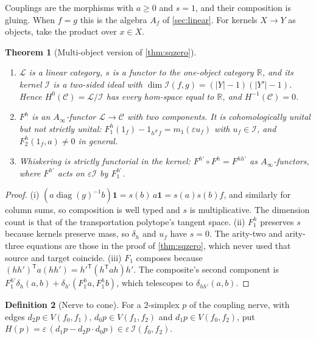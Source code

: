 \documentclass[11pt]{article}
\newtheorem{theorem}{Theorem}[section]
\theoremstyle{definition}
\newtheorem{definition}[theorem]{Definition}
\theoremstyle{remark}
\begin{document}
Couplings are the morphisms with $a\ge0$ and $s=1$, and their composition is gluing. When $f=g$ this is the algebra $A_f$
of \cref{sec:linear}. For kernels $X\to Y$ as objects, take the product over $x\in X$.

\begin{theorem}[Multi-object version of \cref{thm:sqzero}]\label{thm:multicone}
\begin{enumerate}[label=(\roman*)]
\item $\mathcal L$ is a linear category, $s$ is a functor to the one-object category $\mathbb R$, and its kernel $\mathcal I$ is a
  two-sided ideal with $\dim\mathcal I(f,g)=(\lvert Y\rvert-1)(\lvert Y'\rvert-1)$. Hence $H^0(\mathcal C)=\mathcal L/\mathcal I$ has every
  hom-space equal to $\mathbb R$, and $H^{-1}(\mathcal C)=0$.
\item $F^h$ is an $A_\infty$-functor $\mathcal L\to\mathcal C$ with two components. It is cohomologically unital but not strictly
  unital: $F_1^h(1_f)-1_{h^\#f}=m_1(\varepsilon u_f)$ with $u_f\in\mathcal I$, and $F_2^h(1_f,a)\ne0$ in general.
\item Whiskering is strictly functorial in the kernel: $F^{h'}\circ F^h=F^{hh'}$ as $A_\infty$-functors, where $F^{h'}$ acts on
  $\varepsilon\mathcal I$ by $F_1^{h'}$.
\end{enumerate}
\end{theorem}
\begin{proof}
(i) $(a\operatorname{diag}(g)^{-1}b)\mathbf 1=s(b)\,a\mathbf 1=s(a)s(b)f$, and similarly for column sums, so composition is well typed
and $s$ is multiplicative. The dimension count is that of the transportation polytope's tangent space. (ii) $F_1^h$ preserves
$s$ because kernels preserve mass, so $\delta_h$ and $u_f$ have $s=0$. The arity-two and arity-three equations are those
in the proof of \cref{thm:sqzero}, which never used that source and target coincide. (iii) $F_1$ composes because
$(hh')^{\mathsf T}a(hh')=h'^{\mathsf T}(h^{\mathsf T}ah)h'$. The composite's second component is
$F_1^{h'}\delta_h(a,b)+\delta_{h'}(F_1^ha,F_1^hb)$, which telescopes to $\delta_{hh'}(a,b)$.
\end{proof}

\begin{definition}[Nerve to cone]\label{def:nervecone}
For a 2-simplex $p$ of the coupling nerve, with edges $d_2p\in V(f_0,f_1)$, $d_0p\in V(f_1,f_2)$ and $d_1p\in V(f_0,f_2)$, put
$H(p)=\varepsilon\,(d_1p-d_2p\cdot d_0p)\in\varepsilon\,\mathcal I(f_0,f_2)$.
\end{definition}
\end{document}
